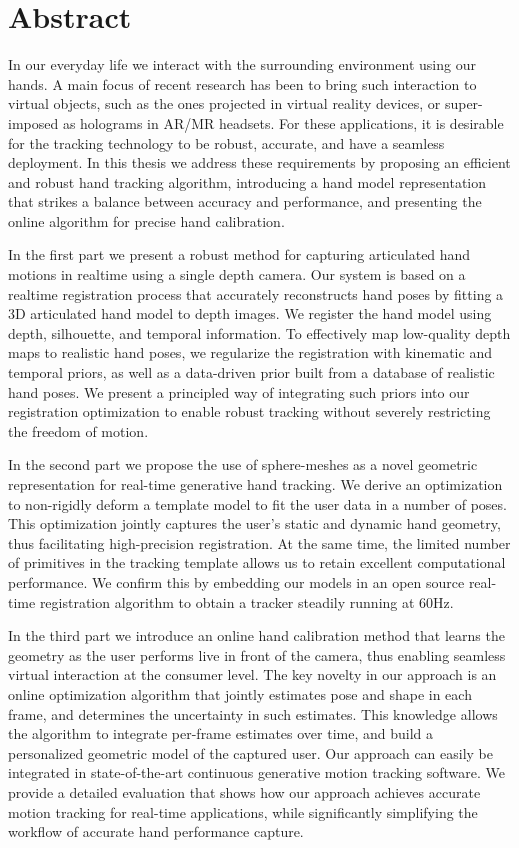 
\chapter*{Abstract}

In our everyday life we interact with the surrounding environment using our hands. A main focus of recent research has been to bring such interaction to virtual objects, such as the ones projected in virtual reality devices, or super-imposed as holograms in AR/MR headsets. For these applications, it is desirable for the tracking technology to be robust, accurate, and have a seamless deployment. In this thesis we address these requirements by proposing an efficient and robust hand tracking algorithm, introducing a hand model representation that strikes a balance between accuracy and performance, and presenting the online algorithm for precise hand calibration.


In the first part we present a robust method for capturing articulated hand motions in realtime using a single depth camera. Our system is based on a realtime registration process that accurately reconstructs hand poses by fitting a 3D articulated hand model to depth images. We register the hand model using depth, silhouette, and temporal information. To effectively map low-quality depth maps to realistic hand poses, we regularize the registration with kinematic and temporal priors, as well as a data-driven prior built from a database of realistic hand poses. We present a principled way of integrating such priors into our registration optimization to enable robust tracking without severely restricting the freedom of motion. 

In the second part we propose the use of sphere-meshes as a novel geometric representation for real-time generative hand tracking.  We derive an optimization to non-rigidly deform a template model to fit the user data in a number of poses. This optimization jointly captures the user's static and dynamic hand geometry, thus facilitating high-precision registration. At the same time, the limited number of primitives in the tracking template allows us to retain excellent computational performance. We confirm this by embedding our models in an open source real-time registration algorithm to obtain a tracker steadily running at 60Hz.

In the third part we introduce an online hand calibration method that learns the geometry as the user performs live in front of the camera, thus enabling seamless virtual interaction at the consumer level. The key novelty in our approach is an online optimization algorithm that jointly estimates pose and shape in each frame, and determines the uncertainty in such estimates. This knowledge allows the algorithm to integrate per-frame estimates over time, and build a personalized geometric model of the captured user. Our approach can easily be integrated in state-of-the-art continuous generative motion tracking software. We provide a detailed evaluation that shows how our approach achieves accurate motion tracking for real-time applications, while significantly simplifying the workflow of accurate hand performance capture.

